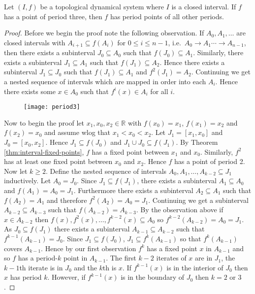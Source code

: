 \begin{thm} \label{thm:period-three-chaos}
    Let $(I, f)$ be a topological dynamical system where $I$ is a closed interval. If $f$ has a point of period three, then $f$ has period points of all other periods.
    \begin{proof}
        Before we begin the proof note the following observation. If $A_0, A_1, \dots$ are closed intervals with $A_{i+1} \subseteq f(A_i)$ for $0 \leq i \leq n - 1$, i.e.\ $A_0 \to A_1 \cdots \to A_{n-1}$, then there exists a subinterval $J_0 \subseteq A_0$ such that $f(J_0) \subseteq A_1$. Similarly, there exists a subinterval $J_1 \subseteq A_1$ such that $f(J_1) \subseteq A_2$. Hence there exists a subinterval $J_1 \subseteq J_0$ such that $f(J_1) \subseteq A_1$ and $f^2(J_1) = A_2$. Continuing we get a nested sequence of intervals which are mapped in order into each $A_i$. Hence there exists some $x \in A_0$ such that $f^i(x) \in A_i$ for all $i$.
        \begin{figure}[H]
            \centering
            \texttt{[image: period3]}
            \label{fig:periodthree}
        \end{figure}
        Now to begin the proof let $x_1, x_0, x_2 \in \mathbb{R}$ with $f(x_0) = x_1$, $f(x_1) = x_2$ and $f(x_2) = x_0$ and assume wlog that $x_1 < x_0 < x_2$. Let $J_1 = [x_1,x_0]$ and $J_0 = [x_0,x_2]$. Hence $J_1 \subseteq f(J_0)$ and $J_1 \cup J_0 \subseteq f(J_1)$. By Theorem \ref{thm:interval-fixed-points}, $f$ has a fixed point between $x_1$ and $x_0$. Similarly, $f^2$ has at least one fixed point between $x_0$ and $x_2$. Hence $f$ has a point of period 2. Now let $k \geq 2$. Define the nested sequence of intervals $A_0, A_1, \dots, A_{k-2} \subseteq J_1$ inductively. Let $A_0 = J_0$. Since $J_1 \subseteq f(J_1)$, there exists a subinterval $A_1 \subseteq A_0$ and $f(A_1) = A_0 = J_1$. Furthermore there exists a subinterval $A_2 \subseteq A_1$ such that $f(A_2) = A_1$ and therefore $f^2(A_2) = A_0 = J_1$. Continuing we get a subinterval $A_{k-2} \subseteq A_{k-3}$ such that $f(A_{k-2}) = A_{k-3}$. By the observation above if $x \in A_{k-2}$ then $f(x), f^2(x), \dots, f^{k-2}(x) \subseteq A_0$ so $f^{k-2}(A_{k-2}) = A_0 = J_1$. As $J_0 \subseteq f(J_1)$ there exists a subinterval $A_{k-1} \subseteq A_{k-2}$ such that $f^{k-1}(A_{k-1}) = J_0$. Since $J_1 \subseteq f(J_0)$, $J_1 \subseteq f^k(A_{k-1})$ so that $f^k(A_{k-1})$ covers $A_{k-1}$. Hence by our first observation $f^k$ has a fixed point $x$ in $A_{k-1}$ and so $f$ has a period-$k$ point in $A_{k-1}$. The first $k-2$ iterates of $x$ are in $J_1$, the $k-1$th iterate is in $J_0$ and the $k$th is $x$. If $f^{k-1}(x)$ is in the interior of $J_0$ then $x$ has period $k$. However, if $f^{k-1}(x)$ is in the boundary of $J_0$ then $k = 2$ or $3$.


\end{proof}
\end{thm}
